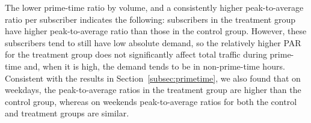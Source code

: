 The lower prime-time ratio by volume, and a consistently higher
peak-to-average ratio per subscriber indicates the following:
subscribers in the treatment group have higher peak-to-average ratio than
those in the control group. However, these subscribers tend to still have
low absolute demand, so the relatively higher PAR for the treatment group does not significantly affect total traffic during prime-time and, when it is high, the demand
tends to be in non-prime-time hours.  Consistent with the results in
Section~\ref{subsec:primetime}, we also found that on weekdays, the
peak-to-average ratios in the treatment group are higher than the control
group, whereas on weekends peak-to-average ratios for both the control and
treatment groups are similar. 